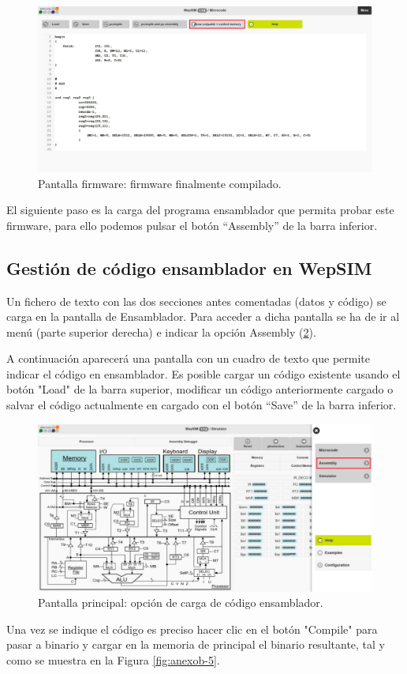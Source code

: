 \begin{figure}[htbp]
 	\centering
 	\includegraphics[width=15cm]{figures/anexob-3}
 	\caption{Pantalla firmware: firmware finalmente compilado.}
	\label{fig:anexob-3}
\end{figure}

El siguiente paso es la carga del programa ensamblador que permita probar este firmware, para ello podemos pulsar el botón ``Assembly'' de la barra inferior.

\subsection*{Gestión de código ensamblador en WepSIM}
\label{ch:anexob_assembly}

Un fichero de texto con las dos secciones antes comentadas (datos y código) se carga en la pantalla de Ensamblador. Para acceder a dicha pantalla se ha de ir al menú (parte superior derecha) e indicar la opción Assembly (\ref{fig:anexob-4}).

A continuación aparecerá una pantalla con un cuadro de texto que permite indicar el código en ensamblador. Es posible cargar un código existente usando el botón "Load" de la barra superior, modificar un código anteriormente cargado o salvar el código actualmente en cargado con el botón ``Save'' de la barra inferior.

\begin{figure}[htbp]
 	\centering
 	\includegraphics[width=15cm]{figures/anexob-4}
 	\caption{Pantalla principal: opción de carga de código ensamblador.}
	\label{fig:anexob-4}
\end{figure}
Una vez se indique el código es preciso hacer clic en el botón "Compile" para pasar a binario y cargar en la memoria de principal el binario resultante, tal y como se muestra en la Figura \ref{fig:anexob-5}.

